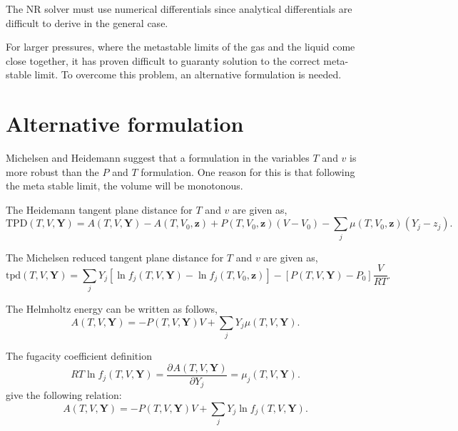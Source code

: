 \documentclass[english]{../thermomemo/thermomemo}
\newcommand*{\pd}[3][]{\frac{\partial^{#1}#2}{\partial{#3}^{#1}}}%
\newcommand{\tpd}{\ensuremath{\text{tpd}}\xspace}
\newcommand{\TPD}{\ensuremath{\text{TPD}}\xspace}
\begin{document}
The NR solver must use numerical differentials since analytical
differentials are difficult to derive in the general case.

For larger pressures, where the metastable limits of the gas and the
liquid come close together, it has proven difficult to guaranty
solution to the correct meta-stable limit. To overcome this problem,
an alternative formulation is needed.

\section{Alternative formulation}
Michelsen and Heidemann \cite{Heidemann1980} suggest that a
formulation in the variables $T$ and $v$ is more robust than the $P$
and $T$ formulation. One reason for this is that following the meta
stable limit, the volume will be monotonous.

The Heidemann tangent plane distance for $T$ and $v$ are given as,
\begin{equation}
  \label{eq:tpd_TV}
  \TPD\left(T,V,\mathbf{Y}\right) =
 A\left(T,V,\mathbf{Y}\right) - A\left(T,V_0,\mathbf{z}\right) +
 P\left(T,V_0,\mathbf{z}\right)\left(V - V_0\right) -
 \underset{j}{\sum}\mu\left(T,V_0,\mathbf{z}\right)\left(Y_j - z_j\right)
 .
\end{equation}

The Michelsen \citet[Chap. 9]{Michelsen2007} reduced tangent plane distance for $T$ and $v$ are given as,
\begin{equation}
  \label{eq:tpd_TV_M}
  \tpd(T,V,\mathbf{Y}) =
  \underset{j}{\sum}Y_j\left[\ln f_j \left(T,V,\mathbf{Y}\right) -
    \ln f_j\left(T,V_0,\mathbf{z}\right)\right] -
  \left[P\left(T,V,\mathbf{Y}\right) - P_0\right]\frac{V}{RT}
  .
\end{equation}

The Helmholtz energy can be written as follows,
\begin{equation}
  \label{eq:A}
 A\left(T,V,\mathbf{Y}\right) = - P\left(T,V,\mathbf{Y}\right)V +
 \underset{j}{\sum}Y_j\mu\left(T,V,\mathbf{Y}\right)
 .
\end{equation}

The fugacity coefficient definition
\begin{equation}
  \label{eq:fugacity}
  R T \ln f_j\left(T,V,\mathbf{Y}\right) =
  \pd{A\left(T,V,\mathbf{Y}\right)}{Y_j} = \mu_j \left(T,V,\mathbf{Y}\right).
\end{equation}
give the following relation:
\begin{equation}
  \label{eq:A2}
 A\left(T,V,\mathbf{Y}\right) = - P\left(T,V,\mathbf{Y}\right)V +
 \underset{j}{\sum}Y_j\ln f_j\left(T,V,\mathbf{Y}\right).
\end{equation}
\end{document}
